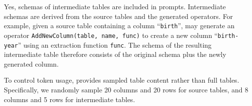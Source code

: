 
Yes, schemas of intermediate tables are included in prompts. Intermediate schemas are derived from the source tables and the generated operators. For example, given a source table containing a column ``\texttt{birth}'', \sys may generate an operator \texttt{AddNewColumn(table, name, func)} to create a new column ``\texttt{birth-year}'' using an extraction function \texttt{func}. The schema of the resulting intermediate table therefore consists of the original schema plus the newly generated column.


To control token usage, \sys provides sampled table content rather than full tables. Specifically, we randomly sample 20 columns and 20 rows for source tables, and 8 columns and 5 rows for intermediate tables.

